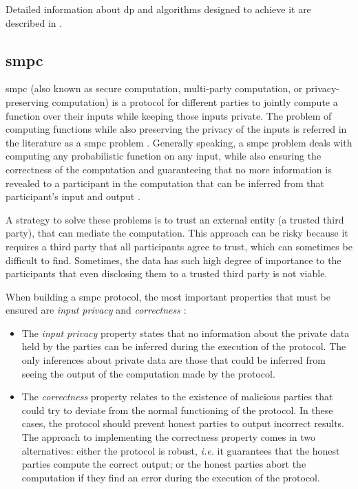 Detailed information about \ac{dp} and algorithms designed to achieve it are described in \cite{dwork2014algorithmic}.


\subsection{\acl{smpc}} 
\label{ssec:SecureMultiPartyComputation}


\acf{smpc} (also known as secure computation, multi-party computation, or privacy-preserving computation) is a protocol for different parties to jointly compute a function over their inputs while keeping those inputs private. The problem of computing functions while also preserving the privacy of the inputs is referred in the literature as a \ac{smpc} problem \cite{yao1982protocols}. Generally speaking, a \ac{smpc} problem deals with computing any probabilistic function on any input, while also ensuring the correctness of the computation and guaranteeing that no more information is revealed to a participant in the computation that can be inferred from that participant's input and output \cite{goldwasser1997multi}. 

A strategy to solve these problems is to trust an external entity (a trusted third party), that can mediate the computation. This approach can be risky because it requires a third party that all participants agree to trust, which can sometimes be difficult to find. Sometimes, the data has such high degree of importance to the participants that even disclosing them to a trusted third party is not viable.

When building a \ac{smpc} protocol, the most important properties that must be ensured are \textit{input privacy} and \textit{correctness} \cite{goldreich1998secure}:

\begin{itemize}
    \setlength\itemsep{1em}

    \item The \textit{input privacy} property states that no information about the private data held by the parties can be inferred during the execution of the protocol. The only inferences about private data are those that could be inferred from seeing the output of the computation made by the protocol.

    \item The \textit{correctness} property relates to the existence of malicious parties that could try to deviate from the normal functioning of the protocol. In these cases, the protocol should prevent honest parties to output incorrect results. The approach to implementing the correctness property comes in two alternatives: either the protocol is robust, \textit{i.e.} it guarantees that the honest parties compute the correct output; or the honest parties abort the computation if they find an error during the execution of the protocol.
\end{itemize}

